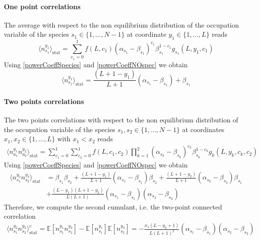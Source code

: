\documentclass[10pt]{article}
\numberwithin{equation}{section}
\numberwithin{equation}{subsection}
\begin{document}
\paragraph{One point correlations}
The average with respect to the non equilibrium distribution of the occupation variable of the species $s_{1}\in \{1,\ldots,N-1\}$ at coordinate $y_{1}\in \{1,\ldots,L\}$ reads
\begin{equation}
	\langle n_{s_{1}}^{y_{1}}\rangle_{\text{stat}}=\sum_{c_{1}=0}^{1}f(L,c_{1})(\alpha_{s_{1}}-\beta_{s_{1}})^{c_{1}}\beta_{s_{1}}^{1-c_{1}}g_{s_{1}}(L,y_{1},c_{1})
\end{equation}
Using \eqref{powerCoeffSpecies} and \eqref{powerCoeffNOspec} we obtain 
\begin{equation}\label{one-pts-corr}
\langle n_{s_{1}}^{y_{1}}\rangle_{\text{stat}}=\frac{(L+1-y_{1})}{L+1}(\alpha_{s_{1}}-\beta_{s_{1}})+\beta_{s_{1}}
\end{equation}
\paragraph{Two points correlations}
The two points correlations with respect to the non equilibrium distribution of the occupation variable of the species $s_{1},s_{2}\in \{1,\ldots,N-1\}$ at coordinates $x_{1},x_{2}\in \{1,\ldots,L\}$ with $x_{1}< x_{2}$ reads 
\begin{equation}
	\begin{split}
	\langle n_{a_{1}}^{y_{1}}n_{a_{2}}^{y_{2}}\rangle_{\text{stat}}= \sum_{c_{1}=0}^{1}\sum_{c_{2}=0}^{1}f(L,c_{1},c_{2})\prod_{k=1}^{2}(\alpha_{s_{k}}-\beta_{s_{k}})^{c_{k}}\beta_{s_{k}}^{1-c_{k}}g_{k}(L,y_{k},c_{k},c_{2})
	\end{split}
\end{equation}
Using \eqref{powerCoeffSpecies} and \eqref{powerCoeffNOspec} we obtain 
\begin{equation}
	\begin{split}
	\langle n_{s_{1}}^{y_{2}} n_{s_{2}}^{y_{2}}\rangle_{\text{stat}}&=\beta_{s_{1}}\beta_{s_{2}}+\frac{(L+1-y_{1})}{L+1}(\alpha_{s_{1}}-\beta_{s_{1}})\beta_{s_{2}}+\frac{(L+1-y_{2})}{L+1}(\alpha_{s_{2}}-\beta_{s_{2}})\beta_{s_{1}}\\&+\frac{(L-y_{1})(L+1-y_{2})}{L(L+1)}(\alpha_{s_{1}}-\beta_{s_{1}})(\alpha_{s_{2}}-\beta_{s_{2}})
	\end{split}
\end{equation}
Therefore, we compute the second cumulant, i.e. the two-point connected correlation
\begin{equation}\label{two-pts-corr}
	\begin{split}
		\langle n_{s_{1}}^{y_{2}} n_{s_{2}}^{y_{2}}\rangle_{\text{stat}}^{c}=\mathbb{E}[n_{s_{1}}^{y_{1}}n_{s_{2}}^{y_{2}}]-\mathbb{E}[n_{s_{1}}^{y_{1}}]\mathbb{E}[n_{s_{2}}^{y_{2}}]=-\frac{x_{1}(L-y_{2}+1)}{L(L+1)^{2}}\left(\alpha_{s_{1}}-\beta_{s_{1}}\right)\left(\alpha_{s_{2}}-\beta_{s_{2}}\right)
	\end{split}
\end{equation}
\end{document}
